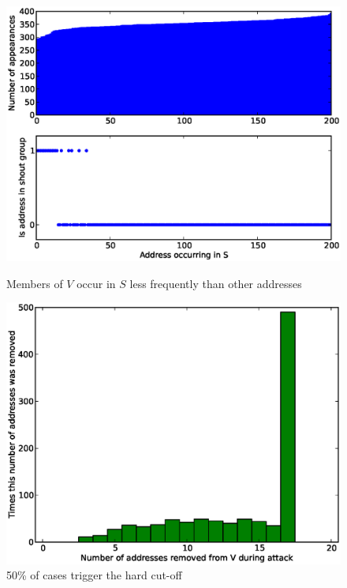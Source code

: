 \documentclass[ %
                    author={Luke Murray},
                supervisor={Dr. Simon Hollis},
                     title={Shadow Peer-to-Peer Networks},
                  subtitle={},
                    degree={MEng},
                      year={2013} ]{thesis}
\begin{document}
\begin{figure}[h]
    \centering
    \begin{minipage}[b]{0.45\linewidth}
        \centering
        \includegraphics[width=\linewidth]{diagrams/binomial1.eps}
        \caption{Members of $V$ occur in $S$ less frequently than other addresses}
        \label{threshold_attack1}
    \end{minipage}
    \hspace{0.5cm}
    \begin{minipage}[b]{0.45\linewidth}
        \centering
        \includegraphics[width=\linewidth]{diagrams/binomial2.eps}
        \caption{50\% of cases trigger the hard cut-off}
        \label{threshold_attack2}
    \end{minipage}
\end{figure}
\end{document}
